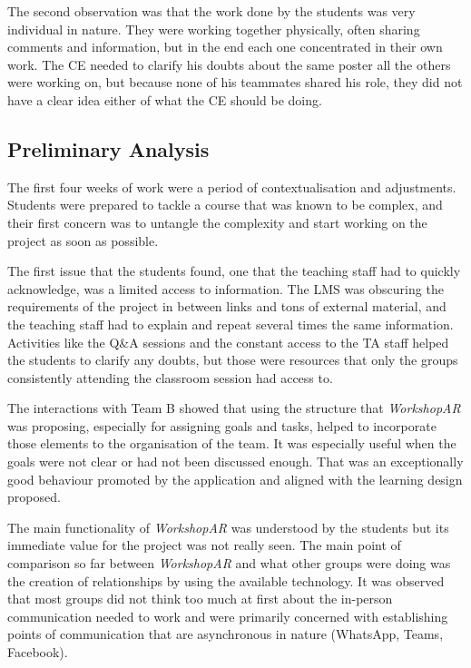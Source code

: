 The second observation was that the work done by the students was very individual in nature. They were working together physically, often sharing comments and information,
but in the end each one concentrated in their own work. The \ac{CE} needed to clarify his doubts about the same poster all the others were working on, but because none of
his teammates shared his role, they did not have a clear idea either of what the \ac{CE} should be doing.

\subsection{Preliminary Analysis \label{sec:6-4-3}}

The first four weeks of work were a period of contextualisation and adjustments. Students were prepared to tackle a course that was known to be complex, and their first
concern was to untangle the complexity and start working on the project as soon as possible.

The first issue that the students found, one that the teaching staff had to quickly acknowledge, was a limited access to information. The \ac{LMS} was obscuring the
requirements of the project in between links and tons of external material, and the teaching staff had to explain and repeat several times the same information. Activities
like the Q\&A sessions and the constant access to the \ac{TA} staff helped the students to clarify any doubts, but those were resources that only the groups consistently
attending the classroom session had access to.

The interactions with Team B showed that using the structure that \emph{WorkshopAR} was proposing, especially for assigning goals and tasks, helped to incorporate those elements
to the organisation of the team. It was especially useful when the goals were not clear or had not been discussed enough. That was an exceptionally good behaviour promoted
by the application and aligned with the learning design proposed.

The main functionality of \emph{WorkshopAR} was understood by the students but its immediate value for the project was not really seen. The main point of comparison so far
between \emph{WorkshopAR} and what other groups were doing was the creation of relationships by using the available technology. It was observed that most groups did not
think too much at first about the in-person communication needed to work and were primarily concerned with establishing points of communication that are asynchronous in
nature (WhatsApp, Teams, Facebook).

